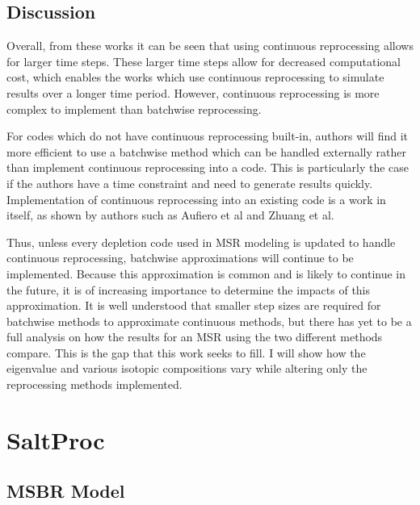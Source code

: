 \subsection{Discussion}
\label{litrev-msr-gaps}

Overall, from these works it can be seen that using continuous reprocessing allows for larger time steps.
These larger time steps allow for decreased computational cost, which enables the works which use continuous reprocessing to simulate results over a longer time period.
However, continuous reprocessing is more complex to implement than batchwise reprocessing.

For codes which do not have continuous reprocessing built-in, authors will find it more efficient to use a batchwise method which can be handled externally rather than implement continuous reprocessing into a code.
This is particularly the case if the authors have a time constraint and need to generate results quickly.
Implementation of continuous reprocessing into an existing code is a work in itself, as shown by authors such as Aufiero et al and Zhuang et al.

Thus, unless every depletion code used in MSR modeling is updated to handle continuous reprocessing, batchwise approximations will continue to be implemented.
Because this approximation is common and is likely to continue in the future, it is of increasing importance to determine the impacts of this approximation.
It is well understood that smaller step sizes are required for batchwise methods to approximate continuous methods, but there has yet to be a full analysis on how the results for an MSR using the two different methods compare.
This is the gap that this work seeks to fill.
I will show how the eigenvalue and various isotopic compositions vary while altering only the reprocessing methods implemented.



\section{SaltProc}
\label{s:theSaltProc}

\subsection{MSBR Model}

